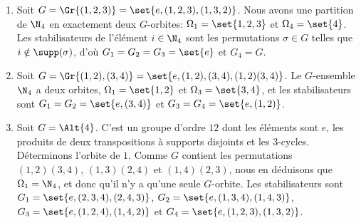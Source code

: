 \begin{enumerate}
  \item
    Soit $G = \Gr{(1,2,3)} = \set{e, (1,2,3), (1,3,2)}$.
    Nous avons une partition de $\N_4$ en exactement deux $G$-orbites: $\Omega_1 = \set{1,2,3}$ et $\Omega_4 = \set{4}$.
    Les stabilisateurs de l'élément $i\in\N_4$ sont les permutations $\sigma\in G$ telles que $i\notin\supp(\sigma)$, d'où $G_1 = G_2 = G_3 = \set{e}$ et $G_4 = G$.

  \item
    Soit $G = \Gr{(1,2),(3,4)} = \set{e, (1,2),(3,4),(1,2)(3,4)}$.
    Le $G$-ensemble $\N_4$ a deux orbites, $\Omega_1 = \set{1,2}$ et $\Omega_3 = \set{3,4}$, et les stabilisateurs sont $G_1 = G_2 = \set{e,(3,4)}$ et $G_3 = G_4 = \set{e, (1,2)}$.

  \item
    Soit $G = \Alt{4}$.
    C'est un groupe d'ordre $12$ dont les éléments sont $e$, les produits de deux transpositions à supports disjoints et les $3$-cycles.
    Déterminons l'orbite de $1$.
    Comme $G$ contient les permutations $(1,2)(3,4)$, $(1,3)(2,4)$ et $(1,4)(2,3)$, nous en déduisons que  $\Omega_1 = \N_4$, et donc qu'il n'y a qu'une seule $G$-orbite.
    Les stabilisateurs sont $G_1 = \set{e, (2,3,4), (2,4,3)}$, $G_2 = \set{e, (1,3,4), (1,4,3)}$, $G_3 = \set{e, (1,2,4), (1,4,2)}$ et $G_4 = \set{e, (1,2,3), (1,3,2)}$.
\end{enumerate}
